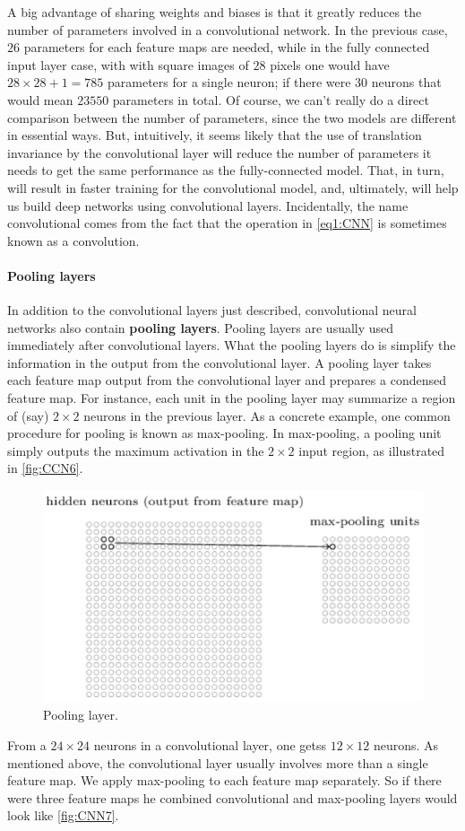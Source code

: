 \documentclass[12pt, letterpaper]{article}
\theoremstyle{definition}
\let\tb\textbf
\begin{document}
A big advantage of sharing weights and biases is that it greatly reduces the number of parameters involved in a convolutional network. In the previous case, $26$ parameters for each feature maps are needed, while in the fully connected input layer case, with with square images of $28$ pixels one would have $28\times 28+1 = 785$ parameters for a single neuron; if there were $30$ neurons that would mean $23550$ parameters in total.
Of course, we can't really do a direct comparison between the number of parameters, since the two models are different in essential ways. But, intuitively, it seems likely that the use of translation invariance by the convolutional layer will reduce the number of parameters it needs to get the same performance as the fully-connected model. That, in turn, will result in faster training for the convolutional model, and, ultimately, will help us build deep networks using convolutional layers. Incidentally, the name convolutional comes from the fact that the operation in \autoref{eq1:CNN} is sometimes known as a convolution. 

\paragraph{\tb{Pooling layers}} In addition to the convolutional layers just described, convolutional neural networks also contain \tb{pooling layers}. Pooling layers are usually used immediately after convolutional layers. What the pooling layers do is simplify the information in the output from the convolutional layer. A pooling layer takes each feature map output from the convolutional layer and prepares a condensed feature map. For instance, each unit in the pooling layer may summarize a region of (say) $2\times 2$ neurons in the previous layer. As a concrete example, one common procedure for pooling is known as max-pooling. In max-pooling, a pooling unit simply outputs the maximum activation in the $2\times 2$ input region, as illustrated in \autoref{fig:CCN6}.

\begin{figure}
\centering
\includegraphics[scale=0.5]{img/CNN6}
\caption{Pooling layer.}
\label{fig:CNN6}
\end{figure}
From a $24\times 24$ neurons in a convolutional layer, one getss $12\times 12$ neurons. As mentioned above, the convolutional layer usually involves more than a single feature map. We apply max-pooling to each feature map separately. So if there were three feature maps he combined convolutional and max-pooling layers would look like \autoref{fig:CNN7}.
\end{document}
